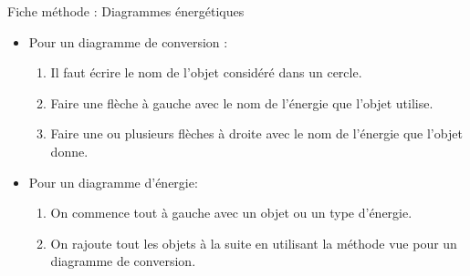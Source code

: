 \documentclass[10pt]{article}
\newcommand{\titre}{Fiche méthode : Diagrammes énergétiques} %
\begin{document}
\begin{titlebox}{\titre}
        \begin{itemize}
            \item Pour un diagramme de conversion :
                \begin{enumerate}
                    \item Il faut écrire le nom de l'objet considéré dans un cercle.
                    \item Faire une flèche à gauche avec le nom de l'énergie que l'objet utilise.
                    \item Faire une ou plusieurs flèches à droite avec 
                    le nom de l'énergie que l'objet donne.
                \end{enumerate} 

            \item Pour un diagramme d'énergie:
                \begin{enumerate}
                    \item On commence tout à gauche avec un objet ou un type d'énergie.
                    \item On rajoute tout les objets à la suite 
                    en utilisant la méthode vue pour un diagramme de conversion.
                \end{enumerate}
        \end{itemize}

    \end{titlebox} 
\end{document}
